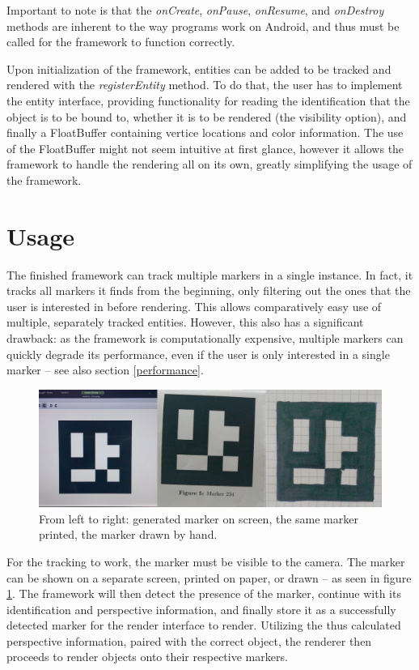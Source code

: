 Important to note is that the \textit{onCreate}, \textit{onPause}, \textit{onResume}, and \textit{onDestroy} methods are inherent to the way programs work on Android, and thus must be called for the framework to function correctly.

Upon initialization of the framework, entities can be added to be tracked and rendered with the \textit{registerEntity} method.
To do that, the user has to implement the entity interface, providing functionality for reading the identification that the object is to be bound to, whether it is to be rendered (the visibility option), and finally a FloatBuffer containing vertice locations and color information.
The use of the FloatBuffer might not seem intuitive at first glance, however it allows the framework to handle the rendering all on its own, greatly simplifying the usage of the framework.

\section{Usage}

The finished framework can track multiple markers in a single instance.
In fact, it tracks all markers it finds from the beginning, only filtering out the ones that the user is interested in before rendering.
This allows comparatively easy use of multiple, separately tracked entities.
However, this also has a significant drawback: as the framework is computationally expensive, multiple markers can quickly degrade its performance, even if the user is only interested in a single marker – see also section \ref{performance}.

\begin{figure}[H]
	\centering
	\includegraphics[width=12cm]{img/mult_marker.png}
	\caption[Usage Forms of Markers]{From left to right: generated marker on screen, the same marker printed, the marker drawn by hand.}
	\label{fig:mult_markers}
\end{figure}

For the tracking to work, the marker must be visible to the camera.
The marker can be shown on a separate screen, printed on paper, or drawn – as seen in figure \ref{fig:mult_markers}.
The framework will then detect the presence of the marker, continue with its identification and perspective information, and finally store it as a successfully detected marker for the render interface to render.
Utilizing the thus calculated perspective information, paired with the correct object, the renderer then proceeds to render objects onto their respective markers.

